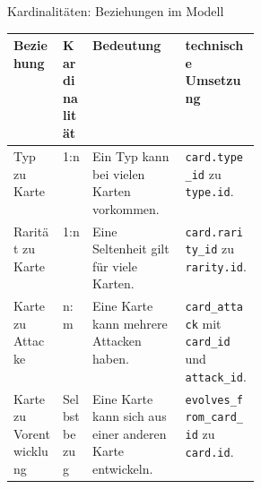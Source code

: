 \documentclass[aspectratio=169,11pt]{beamer}
\begin{document}
\begin{frame}[shrink=12]{Kardinalit\"aten: Beziehungen im Modell}
  \begin{panel}
    \small
    \begin{tabularx}{\linewidth}{@{}L{0.20\linewidth}L{0.12\linewidth}Y Y@{}}
      \toprule
      \textbf{Beziehung} & \textbf{Kardinalit\"at} & \textbf{Bedeutung} & \textbf{technische Umsetzung} \\
      \midrule
      Typ zu Karte & 1:n & Ein Typ kann bei vielen Karten vorkommen. & \texttt{card.type\_id} zu \texttt{type.id}. \\
      Rarit\"at zu Karte & 1:n & Eine Seltenheit gilt f\"ur viele Karten. & \texttt{card.rarity\_id} zu \texttt{rarity.id}. \\
      Karte zu Attacke & n:m & Eine Karte kann mehrere Attacken haben. & \texttt{card\_attack} mit \texttt{card\_id} und \texttt{attack\_id}. \\
      Karte zu Vorentwicklung & Selbstbezug & Eine Karte kann sich aus einer anderen Karte entwickeln. & \texttt{evolves\_from\_card\_id} zu \texttt{card.id}. \\
      \bottomrule
    \end{tabularx}
  \end{panel}
\end{frame}
\end{document}
